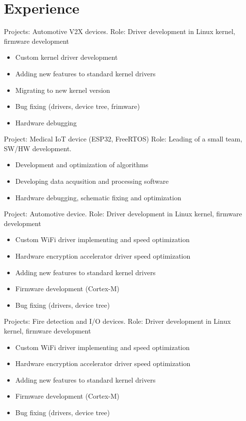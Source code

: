 \documentclass[11pt,a4paper]{moderncv}
\begin{document}
\section{Experience}
  {Projects: Automotive V2X devices.\newline{}
    Role: Driver development in Linux kernel, firmware development
    \begin{itemize}
      \item Custom kernel driver development
      \item Adding new features to standard kernel drivers
      \item Migrating to new kernel version
      \item Bug fixing (drivers, device tree, frimware)
      \item Hardware debugging
    \end{itemize}}
  {Project: Medical IoT device (ESP32, FreeRTOS)\newline{}
    Role: Leading of a small team, SW/HW development.
    \begin{itemize}
      \item Development and optimization of algorithms
      \item Developing data acqusition and processing software
      \item Hardware debugging, schematic fixing and optimization
    \end{itemize}}
  {Project: Automotive device.\newline{}
    Role: Driver development in Linux kernel, firmware development
    \begin{itemize}
      \item Custom WiFi driver implementing and speed optimization
      \item Hardware encryption accelerator driver speed optimization
      \item Adding new features to standard kernel drivers
      \item Firmware development (Cortex-M)
      \item Bug fixing (drivers, device tree)
    \end{itemize}}
  {Projects: Fire detection and I/O devices.\newline{}
    Role: Driver development in Linux kernel, firmware development
    \begin{itemize}
      \item Custom WiFi driver implementing and speed optimization
      \item Hardware encryption accelerator driver speed optimization
      \item Adding new features to standard kernel drivers
      \item Firmware development (Cortex-M)
      \item Bug fixing (drivers, device tree)
    \end{itemize}}
\end{document}
